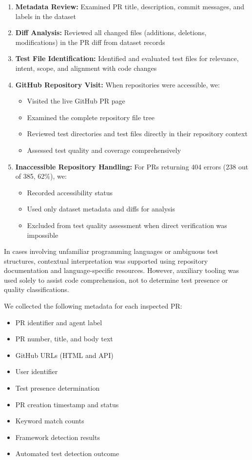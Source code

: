 \documentclass[conference]{IEEEtran}
\begin{document}
\begin{enumerate}
    \item \textbf{Metadata Review:} Examined PR title, description, commit messages, and labels in the dataset
    
    \item \textbf{Diff Analysis:} Reviewed all changed files (additions, deletions, modifications) in the PR diff from dataset records
    
    \item \textbf{Test File Identification:} Identified and evaluated test files for relevance, intent, scope, and alignment with code changes
    
    \item \textbf{GitHub Repository Visit:} When repositories were accessible, we:
    \begin{itemize}
        \item Visited the live GitHub PR page
        \item Examined the complete repository file tree
        \item Reviewed test directories and test files directly in their repository context
        \item Assessed test quality and coverage comprehensively
    \end{itemize}
    
    \item \textbf{Inaccessible Repository Handling:} For PRs returning 404 errors (238 out of 385, 62\%), we:
    \begin{itemize}
        \item Recorded accessibility status
        \item Used only dataset metadata and diffs for analysis
        \item Excluded from test quality assessment when direct verification was impossible
    \end{itemize}
\end{enumerate}

In cases involving unfamiliar programming languages or ambiguous test structures, contextual interpretation was supported using repository documentation and language-specific resources. However, auxiliary tooling was used solely to assist code comprehension, not to determine test presence or quality classifications.

We collected the following metadata for each inspected PR:
\begin{itemize}
    \item PR identifier and agent label
    \item PR number, title, and body text
    \item GitHub URLs (HTML and API)
    \item User identifier
    \item Test presence determination
    \item PR creation timestamp and status
    \item Keyword match counts
    \item Framework detection results
    \item Automated test detection outcome
\end{itemize}
\end{document}
